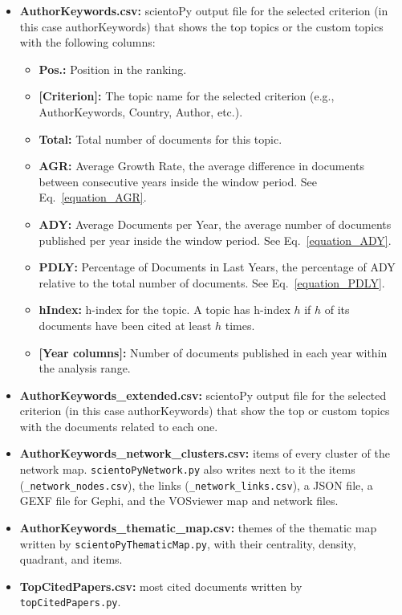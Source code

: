 \documentclass[10pt,letterpaper]{article}
\begin{document}
\begin{itemize}
	\item \textbf{AuthorKeywords.csv: } scientoPy output file for the selected criterion (in this case authorKeywords) that shows the top topics or the custom topics with the following columns:
	\begin{itemize}
	\item \textbf{Pos.:} Position in the ranking.
	\item \textbf{[Criterion]:} The topic name for the selected criterion (e.g., AuthorKeywords, Country, Author, etc.).
	\item \textbf{Total:} Total number of documents for this topic.
	\item \textbf{AGR:} Average Growth Rate, the average difference in documents between consecutive years inside the window period. See Eq.~\ref{equation_AGR}.
	\item \textbf{ADY:} Average Documents per Year, the average number of documents published per year inside the window period. See Eq.~\ref{equation_ADY}.
	\item \textbf{PDLY:} Percentage of Documents in Last Years, the percentage of ADY relative to the total number of documents. See Eq.~\ref{equation_PDLY}.
	\item \textbf{hIndex:} h-index for the topic. A topic has h-index $h$ if $h$ of its documents have been cited at least $h$ times.
	\item \textbf{[Year columns]:} Number of documents published in each year within the analysis range.
	\end{itemize}

	\item \textbf{AuthorKeywords\_extended.csv: } scientoPy output file for the selected criterion (in this case authorKeywords) that show the top or custom topics with the documents related to each one.

	\item \textbf{AuthorKeywords\_network\_clusters.csv: } items of every cluster of the network map. \verb|scientoPyNetwork.py| also writes next to it the items (\verb|_network_nodes.csv|), the links (\verb|_network_links.csv|), a JSON file, a GEXF file for Gephi, and the VOSviewer map and network files.

	\item \textbf{AuthorKeywords\_thematic\_map.csv: } themes of the thematic map written by \verb|scientoPyThematicMap.py|, with their centrality, density, quadrant, and items.

	\item \textbf{TopCitedPapers.csv: } most cited documents written by \verb|topCitedPapers.py|.


\end{itemize}
\end{document}
